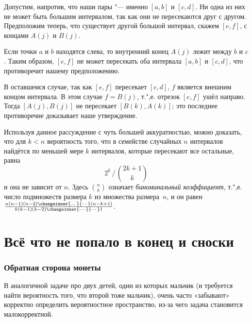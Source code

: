 \documentclass[twoside]{book}
\begin{document}
Допустим, напротив, что наши пары "--- именно $[a, b]$ и $[c, d]$.
Ни одна из них не может быть большим интервалом, так как они не пересекаются друг с другом.
Предположим теперь, что существует другой большой интервал, скажем $[e,f]$, с концами $A(j)$ и $B(j)$.

Если точки $a$ и $b$ находятся слева, то внутренний конец $A(j)$ лежит между $b$ и $c$.
Таким образом, $[e, f]$ не может пересекать оба интервала $[a, b]$ и $[c, d]$, что противоречит нашему предположению.

В оставшемся случае, так как $[e, f]$ пересекает $[c, d]$, $f$ является внешним концом интервала. 
В этом случае $f=B(j)$, т.",е. отрезок $[e, f]$ ушёл направо.
Тогда $[A(j), B(j)]$ не пересекает $[B(k), A(k)]$; это последнее противоречие доказывает наше утверждение.
\heart

Используя данное рассуждение с чуть большей аккуратностью, можно доказать, что 
для $k < n$ вероятность того, что в семействе случайных $n$ интервалов найдётся по меньшей мере $k$ интервалов, которые пересекают все остальные, равна
\[{2^k}\,\big/\,{\binom{2k+1} k}\]
и она не зависит от $n$.
Здесь $\binom n k$ означает \emph{биноминальный коэффициент}, т.",е. число подмножеств размера $k$ из множества размера~$n$, и он равен $
\frac{n(n-1)(n-2)\changeinner{\dots}{\cdots}(n-k+1)}{k(k-1)(k-2)\changeinner{\dots\cdot}{\cdots} 1}$.

\section*{Всё что не попало в конец и сноски}


\subsubsection*{Обратная сторона монеты}
В аналогичной задаче про двух детей, один из которых мальчик (и требуется найти вероятность того, что второй тоже мальчик), 
очень часто «забывают» корректно определить вероятностное пространство, из-за чего задача становится малокорректной.

\end{document}
